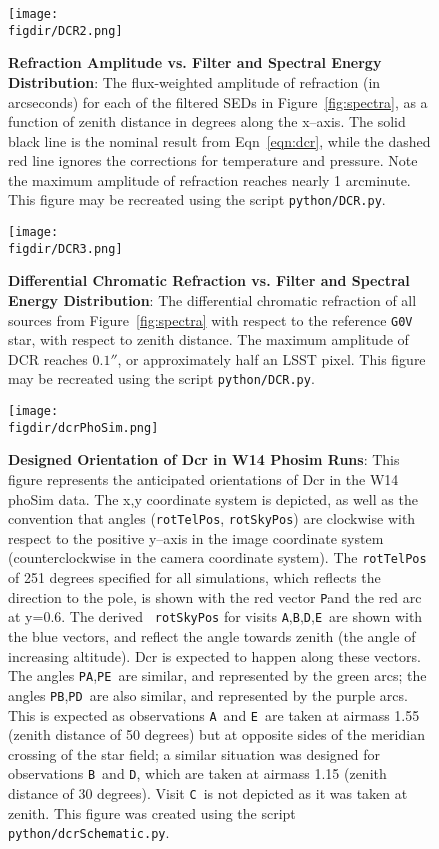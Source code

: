 \documentclass[prd, nofootinbib, floatfix, 11pt, tightenlines, times]{article}
\def\figdir{../figures}
\def\A{{\tt A}}
\def\B{{\tt B}}
\def\C{{\tt C}}
\def\D{{\tt D}}
\def\E{{\tt E}}
\def\P{{\tt P}}
\begin{document}
\clearpage
\begin{figure}[h!]
  \centering
  \texttt{[image: \\figdir/DCR2.png]}
  \caption{{\bf Refraction Amplitude vs. Filter and Spectral Energy
      Distribution}: The flux-weighted amplitude of refraction (in
    arcseconds) for each of the filtered SEDs in
    Figure~\ref{fig:spectra}, as a function of zenith distance in
    degrees along the x--axis.  The solid black line is the nominal
    result from Eqn~\ref{eqn:dcr}, while the dashed red line ignores
    the corrections for temperature and pressure.  Note the maximum
    amplitude of refraction reaches nearly 1 arcminute.  This figure
    may be recreated using the script {\tt python/DCR.py}.}
  \label{fig:refraction}
\end{figure}

\clearpage
\begin{figure}[h!]
  \centering
  \texttt{[image: \\figdir/DCR3.png]}
  \caption{{\bf Differential Chromatic Refraction vs. Filter and
      Spectral Energy Distribution}: The differential chromatic
    refraction of all sources from Figure~\ref{fig:spectra} with
    respect to the reference {\tt G0V} star, with respect to zenith
    distance.  The maximum amplitude of DCR reaches $0.1''$, or
    approximately half an LSST pixel.  This figure may be recreated
    using the script {\tt python/DCR.py}.}
  \label{fig:dcr}
\end{figure}

\begin{figure}[h!]
  \centering
  \texttt{[image: \\figdir/dcrPhoSim.png]}
  \caption{{\bf Designed Orientation of Dcr in W14 Phosim Runs}: This
    figure represents the anticipated orientations of Dcr in the W14
    phoSim data.  The x,y coordinate system is depicted, as well as
    the convention that angles ({\tt rotTelPos}, {\tt rotSkyPos}) are
    clockwise with respect to the positive y--axis in the image
    coordinate system (counterclockwise in the camera coordinate
    system).  The {\tt rotTelPos} of 251 degrees specified for all
    simulations, which reflects the direction to the pole, is shown
    with the red vector \P and the red arc at y=0.6.  The derived {\tt
      rotSkyPos} for visits \A,\B,\D,\E\ are shown with the blue
    vectors, and reflect the angle towards zenith (the angle of
    increasing altitude).  Dcr is expected to happen along these
    vectors.  The angles \P\A,\P\E\ are similar, and represented by
    the green arcs; the angles \P\B,\P\D\ are also similar, and
    represented by the purple arcs.  This is expected as observations
    \A\ and \E\ are taken at airmass 1.55 (zenith distance of 50
    degrees) but at opposite sides of the meridian crossing of the
    star field; a similar situation was designed for observations
    \B\ and \D, which are taken at airmass 1.15 (zenith distance of 30
    degrees).  Visit \C\ is not depicted as it was taken at zenith.
    This figure was created using the script {\tt
      python/dcrSchematic.py}.}
  \label{fig:phosimdcr}
\end{figure}
\end{document}
